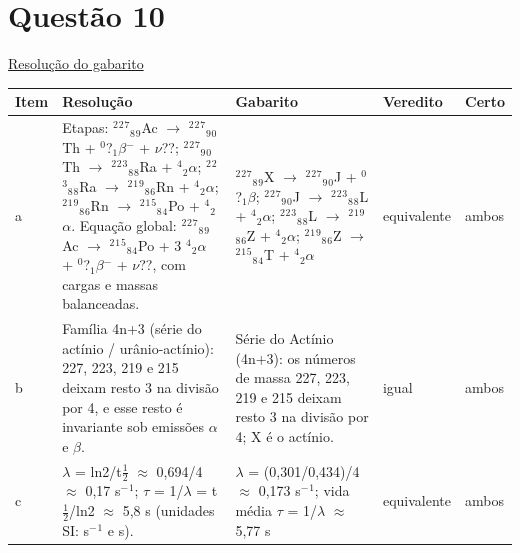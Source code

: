 \documentclass{article}%
\begin{document}
\section*{Questão 10}%
\href{https://poliedroresolve.sistemapoliedro.com.br/vestibulares/ime/2026/ime-2-fase-dia-3-25-10-2025-2-fase-dia-3/dissertativa-10-quimica-2-fase-dia-3-ime-2026}{Resolução do gabarito}\par\smallskip%
\begin{longtable}{@{}p{} p{} p{} p{} p{}@{}}\toprule Item & Resolução & Gabarito & Veredito & Certo \\ \midrule
a & Etapas: $^2$$^2$$^{7}$$_{8}$$_{9}$Ac $\to$ $^2$$^2$$^{7}$$_{9}$$_{0}$Th + $^{0}$?$_{1}$$\beta$$^{-}$ + $\nu$??; $^2$$^2$$^{7}$$_{9}$$_{0}$Th $\to$ $^2$$^2$$^3$$_{8}$$_{8}$Ra + $^{4}$$_{2}$$\alpha$; $^2$$^2$$^3$$_{8}$$_{8}$Ra $\to$ $^2$$^{1}$$^{9}$$_{8}$$_{6}$Rn + $^{4}$$_{2}$$\alpha$; $^2$$^{1}$$^{9}$$_{8}$$_{6}$Rn $\to$ $^2$$^{1}$$^{5}$$_{8}$$_{4}$Po + $^{4}$$_{2}$$\alpha$. Equação global: $^2$$^2$$^{7}$$_{8}$$_{9}$Ac $\to$ $^2$$^{1}$$^{5}$$_{8}$$_{4}$Po + 3 $^{4}$$_{2}$$\alpha$ + $^{0}$?$_{1}$$\beta$$^{-}$ + $\nu$??, com cargas e massas balanceadas. & $^2$$^2$$^{7}$$_{8}$$_{9}$X $\to$ $^2$$^2$$^{7}$$_{9}$$_{0}$J + $^{0}$?$_{1}$$\beta$; $^2$$^2$$^{7}$$_{9}$$_{0}$J $\to$ $^2$$^2$$^3$$_{8}$$_{8}$L + $^{4}$$_{2}$$\alpha$; $^2$$^2$$^3$$_{8}$$_{8}$L $\to$ $^2$$^{1}$$^{9}$$_{8}$$_{6}$Z + $^{4}$$_{2}$$\alpha$; $^2$$^{1}$$^{9}$$_{8}$$_{6}$Z $\to$ $^2$$^{1}$$^{5}$$_{8}$$_{4}$T + $^{4}$$_{2}$$\alpha$ & equivalente & ambos \\
b & Família 4n+3 (série do actínio / urânio{-}actínio): 227, 223, 219 e 215 deixam resto 3 na divisão por 4, e esse resto é invariante sob emissões $\alpha$ e $\beta$. & Série do Actínio (4n+3): os números de massa 227, 223, 219 e 215 deixam resto 3 na divisão por 4; X é o actínio. & igual & ambos \\
c & $\lambda$ = ln2/t$\frac12$ $\approx$ 0,694/4 $\approx$ 0,17 s$^{-}$$^{1}$; $\tau$ = 1/$\lambda$ = t$\frac12$/ln2 $\approx$ 5,8 s (unidades SI: s$^{-}$$^{1}$ e s). & $\lambda$ = (0,301/0,434)/4 $\approx$ 0,173 s$^{-}$$^{1}$; vida média $\tau$ = 1/$\lambda$ $\approx$ 5,77 s & equivalente & ambos \\
\bottomrule\end{longtable}%
\end{document}

